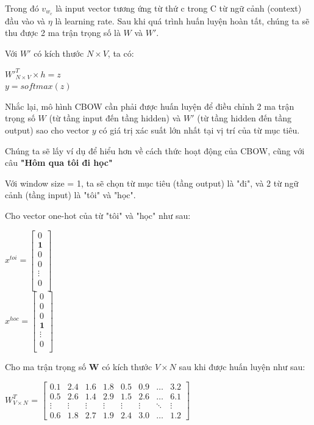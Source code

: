 Trong đó $v_{w_{c}}$ là input vector tương ứng từ thứ c trong C từ ngữ cảnh (context) đầu vào và $\eta$ là learning rate. Sau khi quá trình huấn luyện hoàn tất, chúng ta sẽ thu được 2 ma trận trọng số là $W$ và $W'$.

Với $W'$ có kích thước $N \times V$, ta có:
\begin{center}
    $W'^T_{N\times V}\times h = z$ \\
    $y = softmax(z)$
\end{center}

Nhắc lại, mô hình CBOW cần phải được huấn luyện để điều chỉnh 2 ma trận trọng số $W$ (từ tầng input đến tầng hidden) và $W'$ (từ tầng hidden đến tầng output) sao cho vector $y$ có giá trị xác suất lớn nhất tại vị trí của từ mục tiêu.

Chúng ta sẽ lấy ví dụ để hiểu hơn về cách thức hoạt động của CBOW, cũng với câu \textbf{"Hôm qua tôi đi học"}

Với window size = 1, ta sẽ chọn từ mục tiêu (tầng output) là "đi", và 2 từ ngữ cảnh (tầng input) là "tôi" và "học".

Cho vector one-hot của từ "tôi" và "học" như sau:
\begin{center}
    $x^{toi} =
    \begin{bmatrix}
        0\\
        \textbf{1} \\
        0 \\
        0 \\
        \vdots \\
        0 \\
    \end{bmatrix}$ \\
    \vspace{5mm} %
    $x^{hoc} =
    \begin{bmatrix}
        0\\
        0\\
        0\\
        \textbf{1} \\
        \vdots \\
        0 \\
    \end{bmatrix}$
\end{center}

Cho ma trận trọng số \textbf{W} có kích thước $V\times N$ sau khi được huấn luyện như sau:  
\begin{center}
    $W^T_{V\times N}$ =
    $\begin{bmatrix}
        0.1 & 2.4 & 1.6 & 1.8 & 0.5 & 0.9 & \dots & 3.2 \\
        0.5 & 2.6 & 1.4 & 2.9 & 1.5 & 2.6 & \dots & 6.1 \\
        \vdots & \vdots & \vdots & \vdots & \vdots & \vdots & \ddots & \vdots \\
        0.6 & 1.8 & 2.7 & 1.9 & 2.4 & 3.0 & \dots & 1.2
    \end{bmatrix}$
\end{center}

